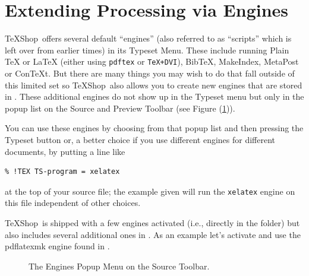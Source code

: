 \documentclass[letterpaper,11pt]{article}
\newcommand{\TS}{\textsf{\TeX Shop}}
\newcommand{\cmd}[1]{\textsf{#1}}
\newcommand{\mnu}[1]{\textsf{#1}}
\begin{document}
\section{Extending Processing via Engines}

\TS\ offers several default ``engines'' (also referred to as ``scripts'' which is left over from earlier times) in its \mnu{Typeset} Menu. These include running \mnu{Plain TeX} or \mnu{LaTeX} (either using \texttt{pdftex} or \texttt{TeX+DVI}), \mnu{BibTeX}, \mnu{MakeIndex}, \mnu{MetaPost} or \mnu{ConTeXt}. But there are many things you may wish to do that fall outside of this limited set so \TS\ also allows you to create new engines that are stored in . These additional engines do not show up in the \mnu{Typeset} menu but only in the popup list on the Source and Preview Toolbar (see Figure (\ref{fig:EnginesPopup})). 

You can use these engines by choosing from that popup list and then pressing the Typeset button or, a better choice if you use different engines for different documents, by putting a line like
\begin{verbatim}
% !TEX TS-program = xelatex
\end{verbatim}
at the top of your source file; the example given will run the \texttt{xelatex} engine on this file independent of other choices.

\TS\ is shipped with a few engines activated (i.e., directly in the  folder) but also includes several additional ones in . As an example let's activate and use the \cmd{pdflatexmk} engine found in .
\begin{figure}
\centering
{}
\caption{The Engines Popup Menu on the Source Toolbar.}
\label{fig:EnginesPopup}
\end{figure}
\end{document}
